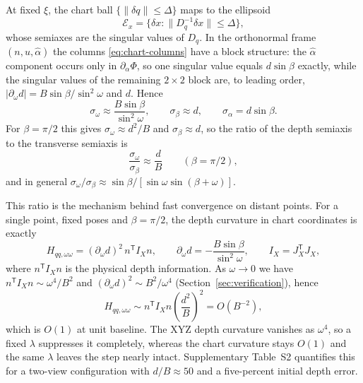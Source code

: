 \documentclass[11pt,a4paper]{article}
\theoremstyle{definition}
\theoremstyle{remark}
\newcommand{\T}{\mathsf{T}}
\begin{document}
At fixed $\xi$, the chart ball $\{\|\delta q\|\le\Delta\}$ maps to the ellipsoid
\begin{equation}
\mathcal E_x=\{\delta x:\|D_q^{-1}\delta x\|\le\Delta\},
\end{equation}
whose semiaxes are the singular values of $D_q$. In the orthonormal frame $(n,u,\hat\alpha)$ the columns \eqref{eq:chart-columns} have a block structure: the $\hat\alpha$ component occurs only in $\partial_\alpha\Phi$, so one singular value equals $d\sin\beta$ exactly, while the singular values of the remaining $2\times2$ block are, to leading order, $|\partial_\omega d|=B\sin\beta/\sin^{2}\omega$ and $d$. Hence
\begin{equation}
\sigma_\omega\approx\frac{B\sin\beta}{\sin^{2}\omega},\qquad
\sigma_\beta\approx d,\qquad
\sigma_\alpha=d\sin\beta .
\label{eq:semiaxes}
\end{equation}
For $\beta=\pi/2$ this gives $\sigma_\omega\approx d^{2}/B$ and $\sigma_\beta\approx d$, so the ratio of the depth semiaxis to the transverse semiaxis is
\begin{equation}
\frac{\sigma_\omega}{\sigma_\beta}\approx\frac{d}{B}
\qquad(\beta=\pi/2),
\label{eq:aspect}
\end{equation}
and in general $\sigma_\omega/\sigma_\beta\approx\sin\beta/[\sin\omega\sin(\beta+\omega)]$.

This ratio is the mechanism behind fast convergence on distant points. For a single point, fixed poses and $\beta=\pi/2$, the depth curvature in chart coordinates is exactly
\begin{equation}
H_{qq,\omega\omega}=(\partial_\omega d)^{2}\,n^{\T}I_Xn,
\qquad
\partial_\omega d=-\frac{B\sin\beta}{\sin^{2}\omega},
\qquad
I_X=J_X^{\T}J_X ,
\label{eq:depth-curvature}
\end{equation}
where $n^{\T}I_Xn$ is the physical depth information. As $\omega\to0$ we have $n^{\T}I_Xn\sim\omega^{4}/B^{2}$ and $(\partial_\omega d)^{2}\sim B^{2}/\omega^{4}$ (Section~\ref{sec:verification}), hence
\begin{equation}
H_{qq,\omega\omega}\sim n^{\T}I_Xn\left(\frac{d^{2}}{B}\right)^{2}=O(B^{-2}),
\label{eq:curvature-scaling}
\end{equation}
which is $O(1)$ at unit baseline. The XYZ depth curvature vanishes as $\omega^{4}$, so a fixed $\lambda$ suppresses it completely, whereas the chart curvature stays $O(1)$ and the same $\lambda$ leaves the step nearly intact. Supplementary Table~S2 quantifies this for a two-view configuration with $d/B\approx50$ and a five-percent initial depth error.
\end{document}
